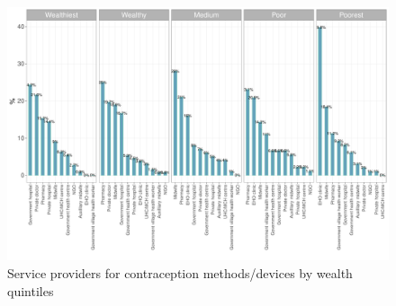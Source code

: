 \documentclass[12pt,a4paper]{article}
\begin{document}
\begin{figure}[H]

{\centering \includegraphics{kayinReport_files/figure-latex/fplan4plot-1} 

}

\caption{Service providers for contraception methods/devices by wealth quintiles}\label{fig:fplan4plot}
\end{figure}
\end{document}
